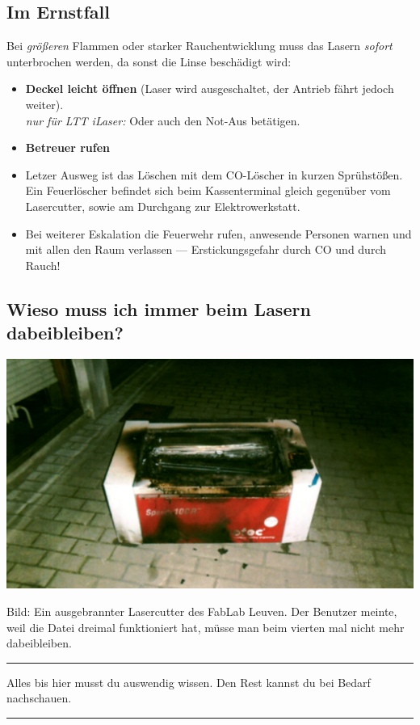 \documentclass{\basedir/fablab-document}
\newcommand{\nurLTT}{\emph{nur für LTT iLaser:} }
\begin{document}
	\subsection{Im Ernstfall}
	Bei \emph{größeren} Flammen oder starker Rauchentwicklung muss das Lasern \emph{sofort} unterbrochen werden, da sonst die Linse beschädigt wird:
	\begin{itemize}
		\item \textbf{Deckel leicht öffnen} (Laser wird ausgeschaltet, der Antrieb fährt jedoch weiter).\\
		\nurLTT Oder auch den Not-Aus betätigen.
		\item \textbf{Betreuer rufen}
		\item Letzer Ausweg ist das Löschen mit dem CO-Löscher in kurzen Sprühstößen. Ein Feuerlöscher befindet sich beim Kassenterminal gleich gegenüber vom Lasercutter, sowie am Durchgang zur Elektrowerkstatt.
		\item Bei weiterer Eskalation die Feuerwehr rufen, anwesende Personen warnen und mit allen den Raum verlassen --- Erstickungsgefahr durch CO und durch Rauch!
	\end{itemize}


	\subsection{Wieso muss ich immer beim Lasern dabeibleiben?}
	\includegraphics[width=.75\linewidth]{./img/laser-abgebrannt_fablab_leuven.jpg}

	Bild: Ein ausgebrannter Lasercutter des FabLab Leuven. Der Benutzer meinte, weil die Datei dreimal funktioniert hat, müsse man beim vierten mal nicht mehr dabeibleiben.



	\vspace{5em}
	\hrule

	Alles bis hier musst du auswendig wissen. Den Rest kannst du bei Bedarf nachschauen.
	\vspace{0.2em}
	\hrule
	\vspace{3em}
\end{document}
